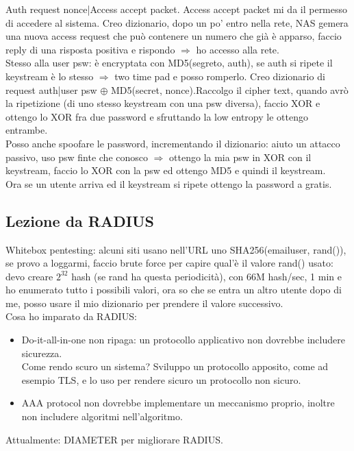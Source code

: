\documentclass[16px]{article}
\begin{document}
Auth request nonce|Access accept packet. Access accept packet mi da il permesso di accedere al sistema. Creo dizionario, dopo un po' entro nella rete, NAS gemera una nuova access request che può contenere un numero che già è apparso, faccio reply di una risposta positiva e rispondo $\Rightarrow$ ho accesso alla rete.\\ Stesso alla user psw: è encryptata con MD5(segreto, auth), se auth si ripete il keystream è lo stesso $\Rightarrow$ two time pad e posso romperlo. Creo dizionario di request auth|user psw $\oplus$ MD5(secret, nonce).Raccolgo il cipher text, quando avrò la ripetizione (di uno stesso keystream con una psw diversa), faccio XOR e ottengo lo XOR fra due password e sfruttando la low entropy le ottengo entrambe.\\ Posso anche spoofare le password, incrementando il dizionario: aiuto un attacco passivo, uso psw finte che conosco $\Rightarrow$ ottengo la mia psw in XOR con il keystream, faccio lo XOR con la psw ed ottengo MD5 e quindi il keystream.\\ Ora se un utente arriva ed il keystream si ripete ottengo la password a gratis.
\subsection{Lezione da RADIUS}
Whitebox pentesting: alcuni siti usano nell'URL  uno SHA256(emailuser, rand()), se provo a loggarmi, faccio brute force per capire qual'è il valore rand() usato: devo creare $2^{32}$ hash (se rand ha questa periodicità), con 66M hash/sec, 1 min e ho enumerato tutto i possibili valori, ora so che se entra un altro utente dopo di me, posso usare il mio dizionario per prendere il valore successivo.\\ Cosa ho imparato da RADIUS:
\begin{itemize}
\item Do-it-all-in-one non ripaga: un protocollo applicativo non dovrebbe includere sicurezza.\\ Come rendo scuro un sistema? Sviluppo un protocollo apposito, come ad esempio TLS, e lo uso per rendere sicuro un protocollo non sicuro.
\item AAA protocol non dovrebbe implementare un meccanismo proprio, inoltre non includere algoritmi nell'algoritmo.
\end{itemize}
Attualmente: DIAMETER per migliorare RADIUS.
\end{document}
